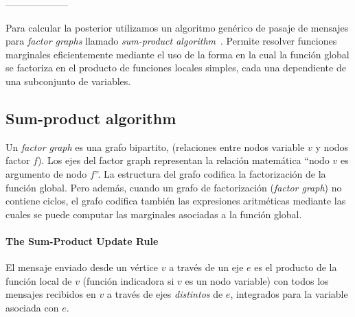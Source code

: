 \documentclass[article]{jss}
\begin{document}





--------------------


Para calcular la posterior utilizamos un algoritmo gen\'erico de pasaje de mensajes para \emph{factor graphs} llamado \emph{sum-product algorithm}~\cite{kschischang2001-factorGraphsAndTheSumProductAlgorithm}.
Permite resolver funciones marginales eficientemente mediante el uso de la forma en la cual la funci\'on global se factoriza en el producto de funciones locales simples, cada una dependiente de una subconjunto de variables.

\subsection{Sum-product algorithm}

Un \emph{factor graph} es una grafo bipartito, (relaciones entre nodos variable $v$ y nodos factor $f$).
Los ejes del factor graph representan la relaci\'on matem\'atica ``nodo $v$ es argumento de nodo $f$''.
La estructura del grafo codifica la factorizaci\'on de la funci\'on global.
Pero adem\'as, cuando un grafo de factorizaci\'on (\emph{factor graph}) no contiene ciclos, el grafo codifica tambi\'en las expresiones aritm\'eticas mediante las cuales se puede computar las marginales asociadas a la funci\'on global.

\paragraph{The Sum-Product Update Rule} El mensaje enviado desde un v\'ertice $v$ a trav\'es de un eje $e$ es el producto de la funci\'on local de $v$ (funci\'on indicadora si $v$ es un nodo variable) con todos los mensajes recibidos en $v$ a trav\'es de ejes \emph{distintos} de $e$, integrados para la variable asociada con $e$.

\vspace{0.3cm}
\end{document}
